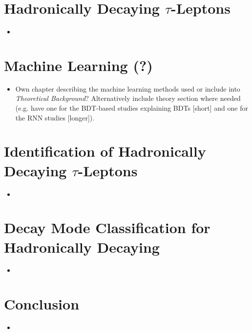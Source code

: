 \section{Hadronically Decaying $\tau$-Leptons}

\begin{itemize}
\item
\end{itemize}

\section{Machine Learning (?)}

\begin{itemize}
\item Own chapter describing the machine learning methods used or include into
  \textit{Theoretical Background}? Alternatively include theory section where
  needed (e.g. have one for the BDT-based studies explaining BDTs [short] and
  one for the RNN studies [longer]).

\end{itemize}

\section{Identification of Hadronically Decaying $\tau$-Leptons}

\begin{itemize}
\item
\end{itemize}

\section{Decay Mode Classification for Hadronically Decaying}

\begin{itemize}
\item
\end{itemize}



\section{Conclusion}

\begin{itemize}
\item
\end{itemize}
